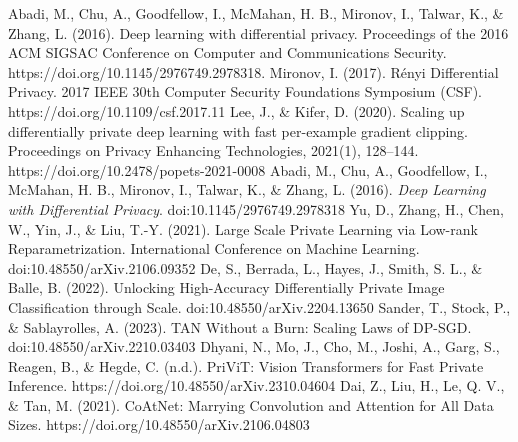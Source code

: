  Abadi, M., Chu, A., Goodfellow, I., McMahan, H. B., Mironov, I., Talwar, K., \& Zhang, L. (2016). Deep learning with differential privacy. Proceedings of the 2016 ACM SIGSAC Conference on Computer and Communications Security. https://doi.org/10.1145/2976749.2978318.
 Mironov, I. (2017). Rényi Differential Privacy. 2017 IEEE 30th Computer Security Foundations Symposium (CSF). https://doi.org/10.1109/csf.2017.11
 Lee, J., \& Kifer, D. (2020). Scaling up differentially private deep learning with fast per-example gradient clipping. Proceedings on Privacy Enhancing Technologies, 2021(1), 128–144. https://doi.org/10.2478/popets-2021-0008
 Abadi, M., Chu, A., Goodfellow, I., McMahan, H. B., Mironov, I., Talwar, K., \& Zhang, L. (2016). \textit{Deep Learning with Differential Privacy}. doi:10.1145/2976749.2978318
 Yu, D., Zhang, H., Chen, W., Yin, J., \& Liu, T.-Y. (2021). Large Scale Private Learning via Low-rank Reparametrization. International Conference on Machine Learning. doi:10.48550/arXiv.2106.09352
 De, S., Berrada, L., Hayes, J., Smith, S. L., \& Balle, B. (2022). Unlocking High-Accuracy Differentially Private Image Classification through Scale. doi:10.48550/arXiv.2204.13650
 Sander, T., Stock, P., \& Sablayrolles, A. (2023). TAN Without a Burn: Scaling Laws of DP-SGD. doi:10.48550/arXiv.2210.03403
 Dhyani, N., Mo, J., Cho, M., Joshi, A., Garg, S., Reagen, B., \& Hegde, C. (n.d.). PriViT: Vision Transformers for Fast Private Inference. https://doi.org/10.48550/arXiv.2310.04604
 Dai, Z., Liu, H., Le, Q. V., & Tan, M. (2021). CoAtNet: Marrying Convolution and Attention for All Data Sizes. https://doi.org/10.48550/arXiv.2106.04803
